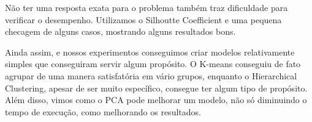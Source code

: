 \documentclass[conference]{IEEEtran}
\begin{document}
Não ter uma resposta exata para o problema também traz dificuldade para verificar o desempenho. Utilizamos o Silhoutte Coefficient e uma pequena checagem de alguns casos, mostrando alguns resultados bons.

Ainda assim, e nossos experimentos conseguimos criar modelos relativamente simples que conseguiram servir algum propósito. O K-means conseguiu de fato agrupar de uma manera satisfatória em vário grupos, enquanto o Hierarchical Clustering, apesar de ser muito específico, consegue ter algum tipo de propósito. Além disso, vimos como o PCA pode melhorar um modelo, não só diminuindo o tempo de execução, como melhorando os resultados.

\begin{thebibliography}{00}
\end{thebibliography}
\end{document}
